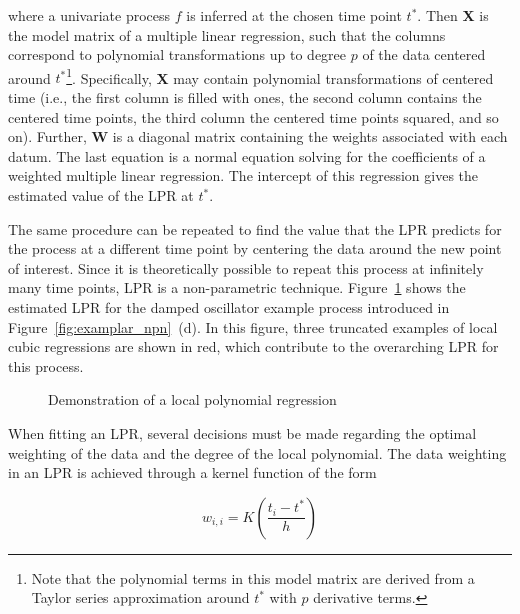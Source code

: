 \documentclass[man, floatsintext]{apa7}
\begin{document}
\noindent where a univariate process $f$ is inferred at the
chosen time point $t^*$. Then \textbf{X} is the model matrix of a multiple
linear regression, such that the columns correspond to polynomial
transformations up to degree $p$ of the data centered around
$t^*$\footnote{Note
  that the polynomial terms in this model matrix are derived from a Taylor
  series approximation around $t^*$ with $p$ derivative terms.}. Specifically,
\textbf{X} may contain polynomial transformations of centered time (i.e., the
first column is filled with ones, the second column contains the centered time
points, the third column the centered time points squared, and so on). Further,
\textbf{W} is a diagonal matrix containing the weights associated with each
datum. The last equation is a normal equation solving for the coefficients of a
weighted multiple linear regression. The intercept of this regression
gives the estimated value of the LPR at $t^*$.

The same procedure can be repeated to find the value that the LPR predicts for
the process at a different time point by centering the data around the new
point of interest. Since it is theoretically possible to repeat this process at
infinitely many time points, LPR is a non-parametric technique.
Figure~\ref{fig:locpol_dem} shows the estimated LPR for the damped oscillator
example process introduced in Figure~\ref{fig:examplar_npn}~(d). In this
figure, three truncated examples of local cubic regressions are shown in red,
which contribute to the overarching LPR for this process.\@

\begin{figure}[!t]
  \caption{Demonstration of a local polynomial regression}
  \label{fig:locpol_dem}
\end{figure}

When fitting an LPR, several decisions must be made regarding the optimal
weighting of the data and the degree of the local polynomial. The data
weighting in an LPR is achieved through a kernel function of the form

\begin{equation}
  w_{i, i} = K(\frac{t_i - t^*}{h})
\end{equation}
\end{document}
